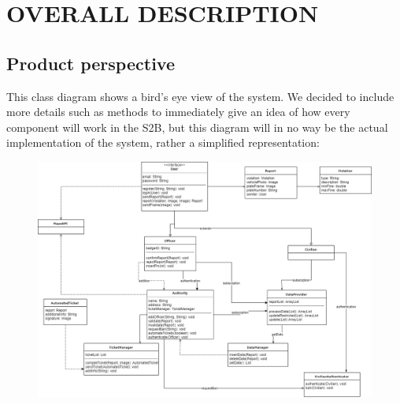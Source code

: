 \documentclass[12pt,a4paper]{article}
\begin{document}
\section{OVERALL DESCRIPTION}
\subsection{Product perspective} 
This class diagram shows a bird's eye view of the system. We decided to include more details such as methods to immediately give an idea of how every component will work in the S2B, but this diagram will in no way be the actual implementation of the system, rather a simplified representation:
\begin{figure}[H]
				\centering
					\begin{adjustwidth}{-25mm}{-25mm}
					        \includegraphics[width=.9\paperwidth,keepaspectratio]{Images/class_diagram}
					\end{adjustwidth}
			\end{figure}
\newpage
\end{document}

